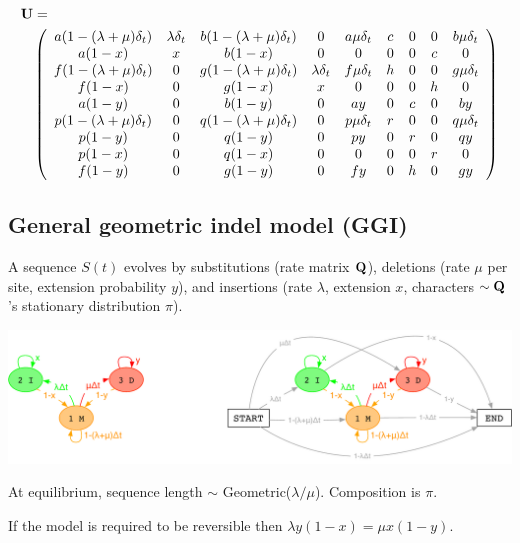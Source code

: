 \documentclass{article}
\begin{document}
\begin{eqnarray*}
  \lefteqn{{\bf U} =} \\
  &&
  \left( \begin{array}{ccccccccc}
a (1-(\lambda+\mu) \delta_t) & \lambda \delta_t & b (1-(\lambda+\mu) \delta_t) & 0 & a \mu \delta_t & c & 0 & 0 & b \mu \delta_t \\
a (1-x) & x & b (1-x) & 0 & 0 & 0 & 0 & c & 0 \\
f (1-(\lambda+\mu) \delta_t) & 0 & g (1-(\lambda+\mu) \delta_t) & \lambda \delta_t & f \mu \delta_t & h & 0 & 0 & g \mu \delta_t \\
f (1-x) & 0 & g (1-x) & x & 0 & 0 & 0 & h & 0 \\
a (1-y) & 0 & b (1-y) & 0 & a y & 0 & c & 0 & b y \\
p (1-(\lambda+\mu) \delta_t) & 0 & q (1-(\lambda+\mu) \delta_t) & 0 & p \mu \delta_t & r & 0 & 0 & q \mu \delta_t \\
p (1-y) & 0 & q (1-y) & 0 & p y & 0 & r & 0 & q y \\
p (1-x) & 0 & q (1-x) & 0 & 0 & 0 & 0 & r & 0 \\
f (1-y) & 0 & g (1-y) & 0 & f y & 0 & h & 0 & g y    
  \end{array} \right)
\end{eqnarray*}

\subsection{General geometric indel model (GGI)}

A sequence $S(t)$ evolves by
substitutions (rate matrix ${\bf Q}$),
deletions (rate $\mu$ per site, extension probability $y$),
and
insertions (rate $\lambda$, extension $x$,
characters $\sim {\bf Q}$'s stationary distribution $\pi$).

\includegraphics[width=\textwidth]{InstantHMM.pdf}

At equilibrium, sequence length $\sim$ Geometric($\lambda/\mu$). Composition is $\pi$.

If the model is required to be reversible then $\lambda y(1-x) = \mu x(1-y)$.
\end{document}
